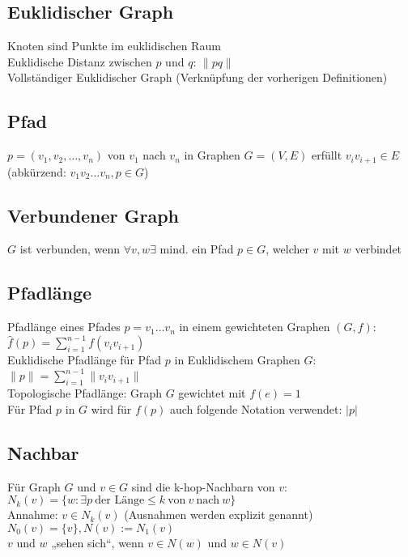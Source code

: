 \documentclass{article}
\begin{document}
\subsection*{Euklidischer Graph}
Knoten sind Punkte im euklidischen Raum \\
Euklidische Distanz zwischen $p$ und $q$: $\| pq \|$ \\
Vollständiger Euklidischer Graph (Verknüpfung der vorherigen Definitionen)

\subsection*{Pfad}
$p = (v_1, v_2, \ldots, v_n)$ von $v_1$ nach $v_n$ in Graphen $G =
(V,E)$ erfüllt $v_i v_{i+1} \in E$ \\
(abkürzend: $v_1 v_2 \ldots v_n, p \in G$)

\subsection*{Verbundener Graph}
$G$ ist verbunden, wenn $\forall v, w \exists$ mind. ein Pfad $p \in G$,
welcher $v$ mit $w$ verbindet

\subsection*{Pfadlänge}
Pfadlänge eines Pfades $p = v_1 \ldots v_n$ in einem gewichteten Graphen
$(G,f)$: \\
$\displaystyle \hat{f}(p) = \sum_{i=1}^{n-1} f(v_i v_{i+1})$ \\

\noindent Euklidische Pfadlänge für Pfad $p$ in Euklidischem Graphen $G$: \\
$\displaystyle \|p\| = \sum_{i=1}^{n-1} \| v_i v_{i+1} \|$ \\

\noindent Topologische Pfadlänge: Graph $G$ gewichtet mit $f(e) = 1$ \\
Für Pfad $p$ in $G$ wird für $f(p)$ auch folgende Notation verwendet: $|p|$

\subsection*{Nachbar}
Für Graph $G$ und $v \in G$ sind die k-hop-Nachbarn von $v$: \\
$N_k(v) = \{ w: \exists p \ \text{der Länge} \leq k \ \text{von} \ v \
\text{nach} \ w \}$ \\
Annahme: $v \in N_k(v)$ (Ausnahmen werden explizit genannt) \\
$N_0(v) = \{v\}, N(v) := N_1(v)$ \\
$v$ und $w$ „sehen sich“, wenn $v \in N(w)$ und $w \in N(v)$
\end{document}
